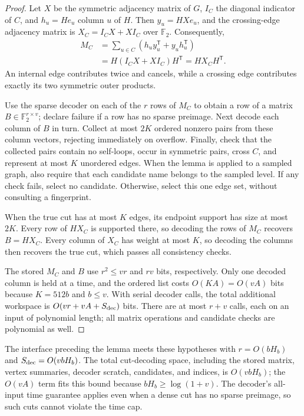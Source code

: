 \documentclass[11pt,letterpaper]{article}
\numberwithin{equation}{section}
\begin{document}
\begin{proof}
Let $X$ be the symmetric adjacency matrix of $G$, $I_C$ the diagonal indicator of $C$, and $h_u=He_u$ column $u$ of $H$.
Then $y_u=HXe_u$, and the crossing-edge adjacency matrix is $X_C=I_CX+XI_C$ over $\mathbb F_2$.
Consequently,
\begin{equation}
\begin{aligned}
M_C&=\sum_{u\in C}(h_uy_u^{\mathsf T}+y_uh_u^{\mathsf T})\\
   &=H(I_CX+XI_C)H^{\mathsf T}=HX_CH^{\mathsf T}.
\end{aligned}                                       \label{eq:forest-df4}
\end{equation}
An internal edge contributes twice and cancels, while a crossing edge contributes exactly its two symmetric outer products.

Use the sparse decoder on each of the $r$ rows of $M_C$ to obtain a row of a matrix $B\in\mathbb F_2^{r\times v}$; declare failure if a row has no sparse preimage.
Next decode each column of $B$ in turn.
Collect at most $2K$ ordered nonzero pairs from these column vectors, rejecting immediately on overflow.
Finally, check that the collected pairs contain no self-loops, occur in symmetric pairs, cross $C$, and represent at most $K$ unordered edges.
When the lemma is applied to a sampled graph, also require that each candidate name belongs to the sampled level.
If any check fails, select no candidate.
Otherwise, select this one edge set, without consulting a fingerprint.

When the true cut has at most $K$ edges, its endpoint support has size at most $2K$.
Every row of $HX_C$ is supported there, so decoding the rows of $M_C$ recovers $B=HX_C$.
Every column of $X_C$ has weight at most $K$, so decoding the columns then recovers the true cut, which passes all consistency checks.

The stored $M_C$ and $B$ use $r^2\le vr$ and $rv$ bits, respectively.
Only one decoded column is held at a time, and the ordered list costs $O(KA)=O(vA)$ bits because $K=512b$ and $b\le v$.
With serial decoder calls, the total additional workspace is $O(vr+vA+S_{\rm dec})$ bits.
There are at most $r+v$ calls, each on an input of polynomial length; all matrix operations and candidate checks are polynomial as well.
\end{proof}

The interface preceding the lemma meets these hypotheses with $r=O(bH_b)$ and $S_{\rm dec}=O(vbH_b)$.
The total cut-decoding space, including the stored matrix, vertex summaries, decoder scratch, candidates, and indices, is $O(vbH_b)$; the $O(vA)$ term fits this bound because $bH_b\ge\log(1+v)$.
The decoder's all-input time guarantee applies even when a dense cut has no sparse preimage, so such cuts cannot violate the time cap.
\end{document}
